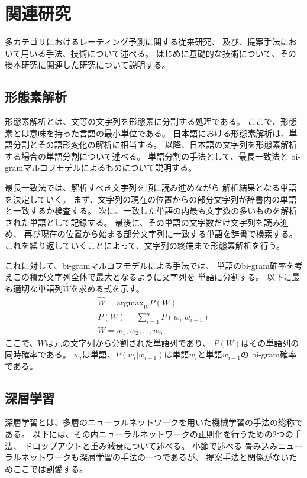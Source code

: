 \section{関連研究} \label{sec:RelatedResearch}

多カテゴリにおけるレーティング予測に関する従来研究、
及び、提案手法において用いる手法、技術について述べる。
はじめに基礎的な技術について、その後本研究に関連した研究について説明する。


\subsection{形態素解析}

形態素解析とは、文等の文字列を形態素に分割する処理である。
ここで、形態素とは意味を持った言語の最小単位である。
日本語における形態素解析は、単語分割とその語形変化の解析に相当する。
以降、日本語の文字列を形態素解析する場合の単語分割について述べる。
単語分割の手法として、最長一致法と
bi-gramマルコフモデルによるものについて説明する。

最長一致法では、解析すべき文字列を順に読み進めながら
解析結果となる単語を決定していく。
まず、文字列の現在の位置からの部分文字列が辞書内の単語と一致するか検査する。
次に、一致した単語の内最も文字数の多いものを解析された単語として記録する。
最後に、その単語の文字数だけ文字列を読み進め、
再び現在の位置から始まる部分文字列に一致する単語を辞書で検索する。
これを繰り返していくことによって、文字列の終端まで形態素解析を行う。

これに対して、bi-gramマルコフモデルによる手法では、
単語のbi-gram確率を考えこの積が文字列全体で最大となるように文字列を
単語に分割する。
以下に最も適切な単語列$\hat{W}$を求める式を示す。
\begin{gather}
  \hat{W} = \text{argmax}_{W} P(W) \\
  P(W) = \sum^{n}_{i = 1} P(w_i | w_{i - 1}) \nonumber \\
  W = w_1, w_2, ... , w_n \nonumber
\end{gather}
ここで、$W$は元の文字列から分割された単語列であり、
$P(W)$はその単語列の同時確率である。
$w_i$は単語、$P(w_i | w_{i - 1})$は単語$w_i$と単語$w_{i - 1}$の
bi-gram確率である。


\subsection{深層学習}

深層学習とは、多層のニューラルネットワークを用いた機械学習の手法の総称である。
以下には、その内ニューラルネットワークの正則化を行うための2つの手法、
ドロップアウトと重み減衰について述べる。
小節で述べる
畳み込みニューラルネットワークも深層学習の手法の一つであるが、
提案手法と関係がないためここでは割愛する。

